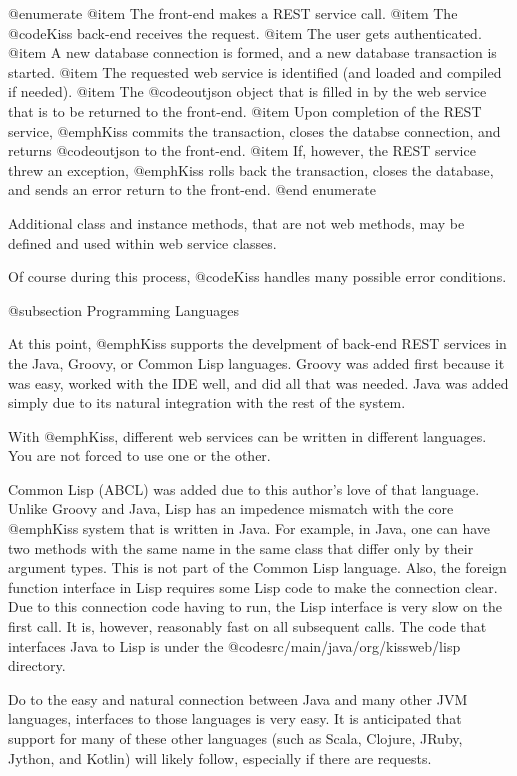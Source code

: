 @enumerate
@item
The front-end makes a REST service call.
@item
The @code{Kiss} back-end receives the request.
@item
The user gets authenticated.
@item
A new database connection is formed, and a new database transaction is started.
@item
The requested web service is identified (and loaded and compiled if needed).
@item
The @code{outjson} object that is filled in by the web service that is to be returned to the front-end.
@item
Upon completion of the REST service, @emph{Kiss} commits the transaction, closes the databse connection, and returns @code{outjson} to the front-end.
@item
If, however, the REST service threw an exception, @emph{Kiss} rolls back the transaction, closes the database, and sends an error return to the front-end.
@end enumerate

Additional class and instance methods, that are not web methods, may
be defined and used within web service classes.

Of course during this process, @code{Kiss} handles many possible error conditions.

@subsection Programming Languages

At this point, @emph{Kiss} supports the develpment of back-end REST
services in the Java, Groovy, or Common Lisp languages.  Groovy was
added first because it was easy, worked with the IDE well, and did all
that was needed.  Java was added simply due to its natural integration
with the rest of the system.

With @emph{Kiss}, different web services can be written in different
languages.  You are not forced to use one or the other.

Common Lisp (ABCL) was added due to this author's love of that
language.  Unlike Groovy and Java, Lisp has an impedence mismatch with
the core @emph{Kiss} system that is written in Java.  For example, in
Java, one can have two methods with the same name in the same class
that differ only by their argument types.  This is not part of the
Common Lisp language.  Also, the foreign function interface in Lisp
requires some Lisp code to make the connection clear.  Due to this
connection code having to run, the Lisp interface is very slow on the
first call.  It is, however, reasonably fast on all subsequent calls.
The code that interfaces Java to Lisp is under the
@code{src/main/java/org/kissweb/lisp} directory.

Do to the easy and natural connection between Java and many other JVM
languages, interfaces to those languages is very easy.  It is
anticipated that support for many of these other languages (such as
Scala, Clojure, JRuby, Jython, and Kotlin) will likely follow,
especially if there are requests.

